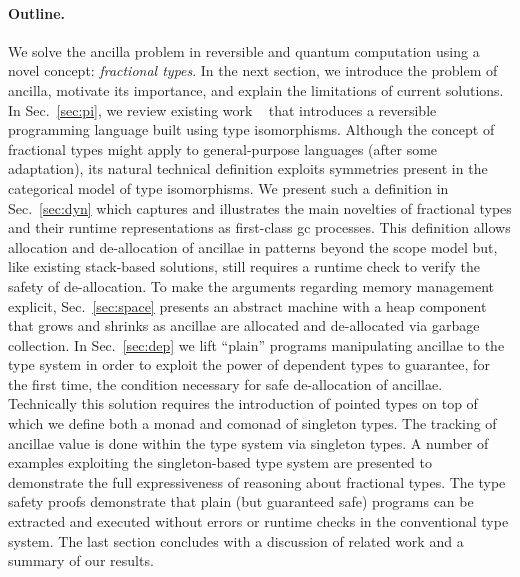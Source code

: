 \documentclass[sigplan,10pt,review,anonymous]{acmart}
\begin{document}
\paragraph*{Outline.} We solve the ancilla problem in reversible and
quantum computation using a novel concept: \emph{fractional types}. In
the next section, we introduce the problem of ancilla, motivate its
importance, and explain the limitations of current solutions. In
Sec.~\ref{sec:pi}, we review existing work%
~\cite{rc2011,DBLP:conf/esop/CaretteS16,rc2012,James:2012:IE:2103656.2103667}
that introduces a reversible programming language built using type
isomorphisms.  Although the concept of fractional types might apply to
general-purpose languages (after some adaptation), its natural
technical definition exploits symmetries present in the categorical
model of type isomorphisms. We present such a definition in
Sec.~\ref{sec:dyn} which captures and illustrates the main novelties
of fractional types and their runtime representations as first-class
gc processes. This definition allows allocation and de-allocation of
ancillae in patterns beyond the scope model but, like existing
stack-based solutions, still requires a runtime check to verify the
safety of de-allocation.
To make the arguments regarding memory
management explicit, Sec.~\ref{sec:space} presents an abstract machine
with a heap component that grows and shrinks as ancillae are allocated
and de-allocated via garbage collection. In Sec.~\ref{sec:dep} we
lift ``plain'' programs manipulating ancillae to the type system in
order to exploit the power of dependent types to guarantee, for the
first time, the condition necessary for safe de-allocation of
ancillae. Technically this solution requires the introduction of
pointed types on top of which we define both a monad and comonad of
singleton types. The tracking of ancillae value is done within the
type system via singleton types. A number of examples exploiting
the singleton-based type system are presented to demonstrate the full
expressiveness of reasoning about fractional types. The type safety proofs demonstrate
that plain (but guaranteed safe)
programs can be extracted and executed without errors or runtime
checks in the conventional type system. The last section concludes
with a discussion of related work and a summary of our results.
\end{document}
